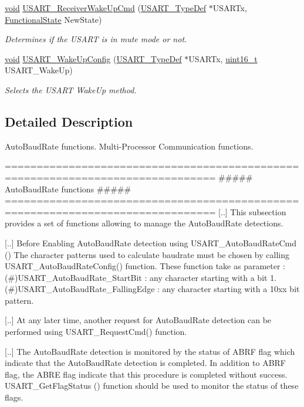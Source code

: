 \begin{DoxyCompactItemize}
\hyperlink{group___n_a_m_e_ga18028b8badbf1ea7e704ccac3c488e82}{void} \hyperlink{group___u_s_a_r_t___group3_gac27b78ce445a16fe33851d2f87781c02}{U\-S\-A\-R\-T\-\_\-\-Receiver\-Wake\-Up\-Cmd} (\hyperlink{struct_u_s_a_r_t___type_def}{U\-S\-A\-R\-T\-\_\-\-Type\-Def} $\ast$U\-S\-A\-R\-Tx, \hyperlink{group___exported__types_gac9a7e9a35d2513ec15c3b537aaa4fba1}{Functional\-State} New\-State)
\begin{DoxyCompactList}\small\item\em Determines if the U\-S\-A\-R\-T is in mute mode or not. \end{DoxyCompactList}\item 
\hyperlink{group___n_a_m_e_ga18028b8badbf1ea7e704ccac3c488e82}{void} \hyperlink{group___u_s_a_r_t___group3_ga4965417c2412c36e462fcad50a8d5393}{U\-S\-A\-R\-T\-\_\-\-Wake\-Up\-Config} (\hyperlink{struct_u_s_a_r_t___type_def}{U\-S\-A\-R\-T\-\_\-\-Type\-Def} $\ast$U\-S\-A\-R\-Tx, \hyperlink{stdint_8h_a273cf69d639a59973b6019625df33e30}{uint16\-\_\-t} U\-S\-A\-R\-T\-\_\-\-Wake\-Up)
\begin{DoxyCompactList}\small\item\em Selects the U\-S\-A\-R\-T Wake\-Up method. \end{DoxyCompactList}\end{DoxyCompactItemize}


\subsection{Detailed Description}
Auto\-Baud\-Rate functions. Multi-\/\-Processor Communication functions.

\begin{DoxyVerb} ===============================================================================
                       ##### AutoBaudRate functions #####
 ===============================================================================
    [..] This subsection provides a set of functions allowing to manage 
         the AutoBaudRate detections.
         
    [..] Before Enabling AutoBaudRate detection using USART_AutoBaudRateCmd ()
         The character patterns used to calculate baudrate must be chosen by calling 
         USART_AutoBaudRateConfig() function. These function take as parameter :
        (#)USART_AutoBaudRate_StartBit : any character starting with a bit 1.
        (#)USART_AutoBaudRate_FallingEdge : any character starting with a 10xx bit pattern. 
                          
    [..] At any later time, another request for AutoBaudRate detection can be performed
         using USART_RequestCmd() function.
         
    [..] The AutoBaudRate detection is monitored by the status of ABRF flag which indicate
         that the AutoBaudRate detection is completed. In addition to ABRF flag, the ABRE flag
         indicate that this procedure is completed without success. USART_GetFlagStatus () 
         function should be used to monitor the status of these flags.  \end{DoxyVerb}


